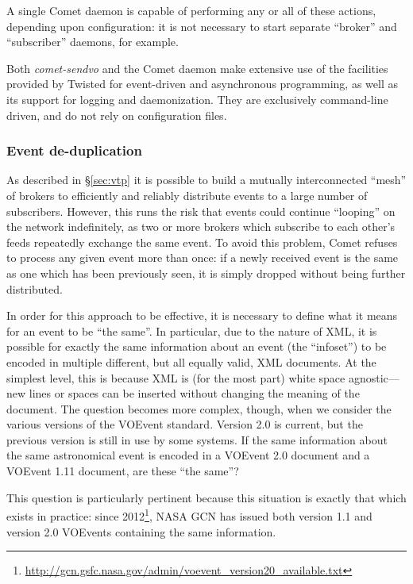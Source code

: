 \documentclass[5p,authoryear]{elsarticle}
\begin{document}
A single Comet daemon is capable of performing any or all of these actions,
depending upon configuration: it is not necessary to start separate ``broker''
and ``subscriber'' daemons, for example.

Both \textit{comet-sendvo} and the Comet daemon make extensive use of the
facilities provided by Twisted for event-driven and asynchronous programming,
as well as its support for logging and daemonization. They are exclusively
command-line driven, and do not rely on configuration files.

\subsubsection{Event de-duplication}
\label{sec:design:dedup}

As described in \S\ref{sec:vtp} it is possible to build a mutually
interconnected ``mesh'' of brokers to efficiently and reliably distribute
events to a large number of subscribers. However, this runs the risk that
events could continue ``looping'' on the network indefinitely, as two or more
brokers which subscribe to each other's feeds repeatedly exchange the same
event. To avoid this problem, Comet refuses to process any given event more
than once: if a newly received event is the same as one which has been
previously seen, it is simply dropped without being further distributed.

In order for this approach to be effective, it is necessary to define what it
means for an event to be ``the same''. In particular, due to the nature of
XML, it is possible for exactly the same information about an event (the
``infoset'') to be encoded in multiple different, but all equally valid, XML
documents. At the simplest level, this is because XML is (for the most part)
white space agnostic---new lines or spaces can be inserted without changing
the meaning of the document. The question becomes more complex, though, when
we consider the various versions of the VOEvent standard. Version 2.0
\citep{Seaman:2011} is current, but the previous version
\citep[1.1;][]{Seaman:2006} is still in use by some systems. If the same
information about the same astronomical event is encoded in a VOEvent 2.0
document and a VOEvent 1.11 document, are these ``the same''?

This question is particularly pertinent because this situation is exactly that
which exists in practice: since
2012\footnote{\url{http://gcn.gsfc.nasa.gov/admin/voevent_version20_available.txt}},
NASA GCN has issued both version 1.1 and version 2.0 VOEvents containing the
same information.
\end{document}
